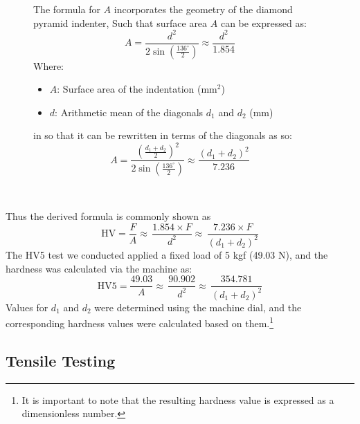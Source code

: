 \documentclass{article}
\begin{document}
\begin{figure}[H]
\begin{minipage}{0.51\textwidth}
\begin{itemize}[itemsep=-1mm]
            \end{itemize}
            The formula for $A$ incorporates the geometry of the diamond pyramid indenter, 
            Such that surface area \(A\) can be expressed as:
            \begin{equation}
                A = \frac{d^2}{2\sin\left(\frac{136^\circ}{2}\right)} \approx \frac{d^2}{1.854} 
            \end{equation}
            Where:  
            \begin{itemize}[itemsep=-1mm]
                \item \(A\): Surface area of the indentation (mm\(^2\))
                \item \(d\): Arithmetic mean of the diagonals \(d_1\) and \(d_2\) (mm)
            \end{itemize}
            in so that it can be rewritten in terms of the diagonals as so:
            \begin{equation}
                A= \frac{\left(\frac{d_1+d_2}{2}\right)^2}{2\sin\left(\frac{136^\circ}{2}\right)} \approx \frac{\left(d_1 + d_2\right)^2}{7.236}
            \end{equation}
        \end{minipage}\\
    \end{figure}
    \vspace{-1em}\noindent
    Thus the derived formula is commonly shown as
    \begin{equation}
        {\text{HV} = \frac{F}{A} \approx \, \frac{1.854 \times F}{d^2} \approx \, \frac{7.236\times F}{\left(d_1 + d_2\right)^2}}    
    \end{equation} 
    The HV5 test we conducted applied a fixed load of 5 kgf (49.03 N), and the hardness was calculated via the machine as:  
    \begin{equation}
        \text{HV5} = \frac{49.03}{A} \approx \, \frac{90.902}{d^2} \approx \, \frac{354.781}{\left(d_1 + d_2\right)^2}
    \end{equation}
    Values for \(d_1\) and \(d_2\) were determined using the machine dial, and the corresponding hardness values were calculated based on them.\footnote{It is important to note that the resulting hardness value is expressed as a dimensionless number.}\\[8pt]
    \newpage

    \subsection{Tensile Testing}
    
\end{document}
